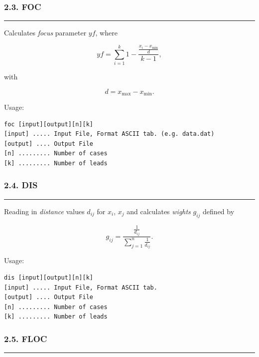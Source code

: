 \documentclass[
]{article}
\begin{document}
\hypertarget{foc}{%
\subsubsection{2.3. FOC}\label{foc}}

\begin{center}\rule{0.5\linewidth}{0.5pt}\end{center}

Calculates \emph{focus} parameter \(yf\), where

\[yf = \sum_{i = 1}^{k}{1 - \frac{\frac{x_{i} - x_{\min}}{d}}{k - 1}},\]

with

\[d = x_{\max} - x_{\min}.\]

Usage:

\begin{verbatim}
foc [input][output][n][k]
[input] ..... Input File, Format ASCII tab. (e.g. data.dat)
[output] .... Output File
[n] ......... Number of cases
[k] ......... Number of leads
\end{verbatim}

\hypertarget{dis}{%
\subsubsection{2.4. DIS}\label{dis}}

\begin{center}\rule{0.5\linewidth}{0.5pt}\end{center}

Reading in \emph{distance} values \(d_{ij}\) for \(x_{i}\), \(x_{j}\)
and calculates \emph{wights} \(g_{ij}\) defined by

\[g_{ij} = \frac{\frac{1}{d_{ij}}}{\sum_{j = 1}^{n}\frac{1}{d_{ij}}}.\]

Usage:

\begin{verbatim}
dis [input][output][n][k]
[input] ..... Input File, Format ASCII tab. 
[output] .... Output File
[n] ......... Number of cases
[k] ......... Number of leads
\end{verbatim}

\hypertarget{floc}{%
\subsubsection{2.5. FLOC}\label{floc}}

\begin{center}\rule{0.5\linewidth}{0.5pt}\end{center}
\end{document}
